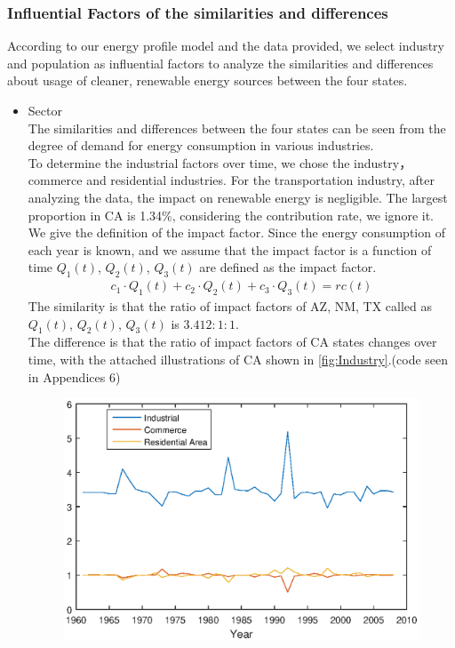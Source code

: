 \documentclass{mcmthesis}
\begin{document}
\subsubsection{Influential Factors of the similarities and differences}
According to our energy profile model and the data provided, we select industry and population as influential factors to analyze the similarities and differences about usage of cleaner, renewable energy sources between the four states. 
\begin{itemize}
	\item Sector\\
	The similarities and differences between the four states can be seen from the degree of demand for energy consumption in various industries.\\ To determine the industrial factors over time, we chose the industry，commerce and residential industries. For the transportation industry, after analyzing the data, the impact on renewable energy is negligible. The largest proportion in CA is 1.34\%, considering the contribution rate, we ignore it.\\
	We give the definition of the impact factor. Since the energy consumption of each year is known, and we assume that the impact factor is a function of time $ Q_{1}(t) $, $ Q_{2}(t) $, $ Q_{3}(t) $ are defined as the impact factor.
	\begin{gather}
	c_{1} \cdot Q_{1}(t)+c_{2} \cdot Q_{2}(t)+c_{3} \cdot Q_{3}(t)=\mathit{rc(t)}
	\end{gather}
	The similarity is that the ratio of impact factors of AZ, NM, TX called as $ Q_{1}(t) $, $ Q_{2}(t) $, $ Q_{3}(t) $ is $ 3.412:1:1 $.\\
	The difference is that the ratio of impact factors of CA states changes over time, with the attached illustrations of CA shown in \autoref{fig:Industry}.(code seen in Appendices 6)
	\begin{figure}[h]
		\centering
		\includegraphics[width=12cm]{figure/Factorsofthesimilaritiesanddifferences}

\end{figure}
\end{itemize}
\end{document}
